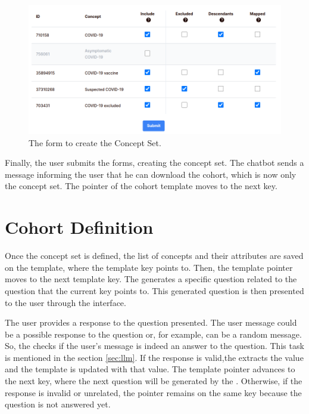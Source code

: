 \begin{figure}[H]
  \includegraphics[width=1\textwidth]{figs/chapter4/form.png}
  \centering
  \caption{The form to create the Concept Set.}
  \label{fig_forms}
\end{figure}

Finally, the user submits the forms, creating the concept set. The chatbot sends a message informing the user that he can download the cohort, which is now only the concept set. The pointer of the cohort template moves to the next key.



\section{Cohort Definition}




Once the concept set is defined, the list of concepts and their attributes are saved on the template, where the template key points to. Then, the template pointer moves to the next template key. The {\llm} generates a specific question related to the question that the current key points to. This generated question is then presented to the user through the interface.

The user provides a response to the question presented. The user message could be a possible response to the question or, for example, can be a random message. So, the {\llm} checks if the user's message is indeed an answer to the question. This task is mentioned in the section \ref{sec:llm}. If the response is valid,the {\llm} extracts the value and the template is updated with that value. The template pointer advances to the next key, where the next question will be generated by the {\llm}. Otherwise, if the response is invalid or unrelated, the pointer remains on the same key because the question is not answered yet.

